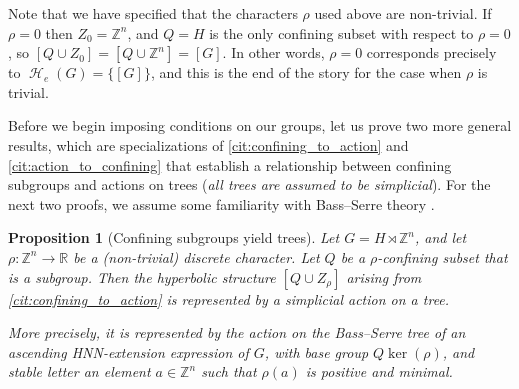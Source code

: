 \documentclass[reqno,12pt]{amsart}\setcounter{tocdepth}{1}
\newtheorem{proposition}[theorem]{Proposition}
\theoremstyle{definition}
\newcommand{\Z}{\mathbb{Z}}
\newcommand{\R}{\mathbb{R}}
\DeclareMathOperator{\Hyp}{\mathcal{H}}
\numberwithin{equation}{section}
\begin{document}
Note that we have specified that the characters $\rho$ used above are non-trivial. If $\rho=0$ then $Z_0=\Z^n$, and $Q=H$ is the only confining subset with respect to $\rho=0$, so $[Q\cup Z_0]=[Q\cup \Z^n]=[G]$. In other words, $\rho=0$ corresponds precisely to $\Hyp_e(G)=\{[G]\}$, and this is the end of the story for the case when $\rho$ is trivial.

\medskip

Before we begin imposing conditions on our groups, let us prove two more general results, which are specializations of \cref{cit:confining_to_action} and \cref{cit:action_to_confining} that establish a relationship between confining subgroups and actions on trees (\emph{all trees are assumed to be simplicial}). For the next two proofs, we assume some familiarity with Bass--Serre theory \cite{serre}.

\begin{proposition}[Confining subgroups yield trees]\label{prop:subgroups_to_trees}
Let $G=H\rtimes \Z^n$, and let $\rho\colon \Z^n\to \R$ be a (non-trivial) discrete character. Let $Q$ be a $\rho$-confining subset that is a subgroup. Then the hyperbolic structure $[Q\cup Z_\rho]$ arising from \cref{cit:confining_to_action} is represented by a simplicial action on a tree.

More precisely, it is represented by the action on the Bass--Serre tree of an ascending HNN-extension expression of $G$, with base group $Q \ker(\rho)$, and stable letter an element $a \in \Z^n$ such that $\rho(a)$ is positive and minimal.
\end{proposition}
\end{document}

